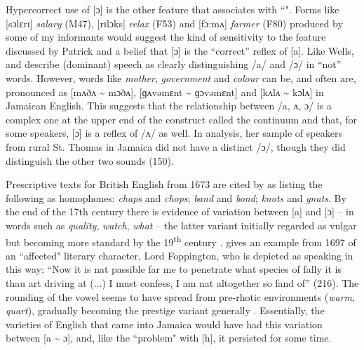 Hypercorrect use of [ɔ] is the other feature that \citet{Patrick1997} associates with ``". Forms like [sɔlɛrɪ] \textit{salary} (M47), [rɪlɔks] \textit{relax} (F53) and [fɔ:mʌ] \textit{farmer} (F80) produced by some of my informants would suggest the kind of sensitivity to the feature discussed by Patrick and a belief that [ɔ] is the “correct” reflex of [a].  Like Wells, \citet[151]{BeckfordWassink2001} and \citet[42]{Meade2001} describe  (dominant) speech as clearly distinguishing /a/ and /ɔ/ in “not” words.  However, words like \textit{mother}, \textit{government} and \textit{colour} can be, and often are, pronounced as [mʌðʌ {\textasciitilde} mɔðʌ], [ɡʌvǝmɛnt {\textasciitilde} ɡɔvǝmɛnt] and [kʌlʌ {\textasciitilde} kɔlʌ] in Jamaican English.  This suggests that the relationship between /a, ʌ, ɔ/ is a complex one at the upper end of the construct called the continuum and that, for some speakers, [ɔ] is a reflex of /ʌ/ as well.  In  analysis, her sample of speakers from rural St. Thomas in Jamaica did not have a distinct /ɔ/, though they did distinguish the other two sounds (150). 

Prescriptive texts for British English from 1673 are cited by \citet[356]{Freeborn1998} as listing the following as homophones: \textit{chaps} and \textit{chops}; \textit{band} and \textit{bond}; \textit{knots} and \textit{gnats}.  By the end of the 17th century there is evidence of variation between [a] and [ɔ] -- in words such as \textit{quality}, \textit{watch}, \textit{what} -- the latter variant initially regarded as vulgar but becoming more standard by the 19\textsuperscript{th} century \citep[128]{Beal2002}.  \citet{Mugglestone1995} gives an example from 1697 of an ``affected" literary character, Lord Foppington, who is depicted as speaking in this way: “Now it is nat passible far me to penetrate what species of fally it is thau art driving at (${\ldots}$) I must confess, I am nat altogether so fand of” (216). The rounding of the vowel seems to have spread from pre-rhotic environments (\textit{warm}, \textit{quart}), gradually becoming the prestige variant generally \citep[128]{Beal2002}.  Essentially, the varieties of English that came into Jamaica would have had this variation between [a {\textasciitilde} ɔ], and, like the ``problem" with [h], it persisted for some time.


